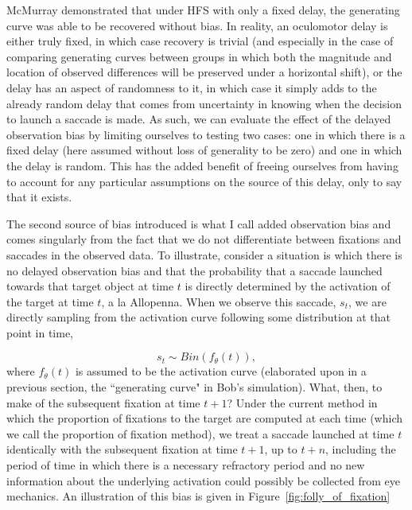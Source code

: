 \documentclass{article}
\begin{document}
McMurray demonstrated that under HFS with only a fixed delay, the generating curve was able to be recovered without bias. In reality, an oculomotor delay is either truly fixed, in which case recovery is trivial (and especially in the case of comparing generating curves between groups in which both the magnitude and location of observed differences will be preserved under a horizontal shift), or the delay has an aspect of randomness to it, in which case it simply adds to the already random delay that comes from uncertainty in knowing when the decision to launch a saccade is made. As such, we can evaluate the effect of the delayed observation bias by limiting ourselves to testing two cases: one in which there is a fixed delay (here assumed without loss of generality to be zero) and one in which the delay is random. This has the added benefit of freeing ourselves from having to account for any particular assumptions on the source of this delay, only to say that it exists.

The second source of bias introduced is what I call added observation bias and comes singularly from the fact that we do not differentiate between fixations and saccades in the observed data. To illustrate, consider a situation is which there is no delayed observation bias and that the probability that a saccade launched towards that target object at time $t$ is directly determined by the activation of the target at time $t$, a la Allopenna. When we observe this saccade, $s_t$, we are directly sampling from the activation curve following some distribution at that point in time, 

\begin{equation} \label{eq:saccade_dist}
s_t \sim Bin(f_{\theta}(t)),
\end{equation}
where $f_{\theta}(t)$ is assumed to be the activation curve (elaborated upon in a previous section, the ``generating curve" in Bob's simulation). What, then, to make of the subsequent fixation at time $t+1$? Under the current method in which the proportion of fixations to the target are computed at each time (which we call the proportion of fixation method), we treat a saccade launched at time $t$ identically with the subsequent fixation at time $t+1$, up to $t+n$, including the period of time in which there is a necessary refractory period and no new information about the underlying activation could possibly be collected from eye mechanics. An illustration of this bias is given in Figure~\ref{fig:folly_of_fixation}
\end{document}
